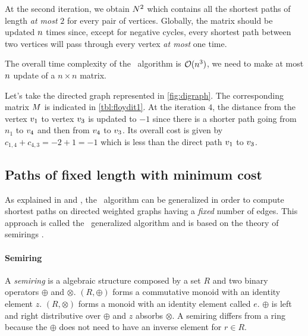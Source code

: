At the second iteration, we obtain $N^2$ which contains all the shortest paths of length \textit{at most} $2$ for every pair of vertices. Globally, the matrix should be updated $n$ times since, except for negative cycles, every shortest path between two vertices will pass through every vertex \textit{at most} one time.

The overall time complexity of the \FW\ algorithm is $\mathcal{O}(n^3)$, we need to make at most $n$ update of a $n \times n$ matrix.





\begin{example}
  Let's take the directed graph represented in \cref{fig:digraph}. The corresponding matrix $M$ is indicated in \cref{tbl:floydit1}. At the iteration $4$, the distance from the vertex $v_1$ to vertex $v_3$ is updated to $-1$ since there is a shorter path going from $n_1$ to $v_4$ and then from $v_4$ to $v_3$. Its overall cost is given by $c_{1,4} + c_{4,3} = -2 + 1 = -1$ which is less than the direct path $v_1$ to $v_3$.
\end{example}

\subsection{Paths of fixed length with minimum cost}

As explained in \cite{floydGeneric} and \cite{cpweb}, the \FW\ algorithm can be generalized in order to compute shortest paths on directed weighted graphs having a \textit{fixed} number of edges. This approach is called the \FW\ generalized algorithm and is based on the theory of semirings \cite{ullman}.

\paragraph{Semiring} A \textit{semiring}\cite{semiring} is a algebraic structure composed by a set $R$ and two binary operators $\oplus$ and $\otimes$. $(R, \oplus)$ forms a commutative monoid with an identity element $z$. $(R, \otimes)$ forms a monoid with an identity element called $e$. $\oplus$ is left and right distributive over $\oplus$ and $z$ absorbs $\otimes$. A semiring differs from a ring because the $\oplus$ does not need to have an inverse element for $r \in R$.

